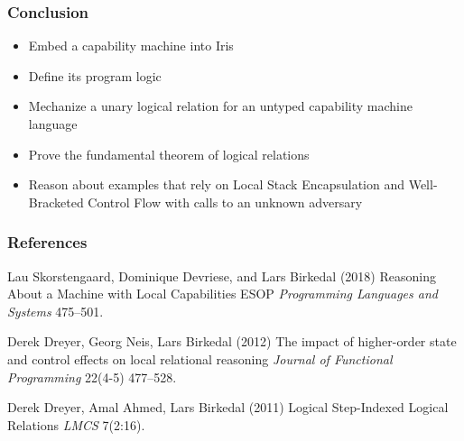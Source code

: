 \documentclass{beamer}
\begin{document}

\begin{frame}
\frametitle{Conclusion}

\begin{itemize}
	\item Embed a capability machine into Iris
	\item Define its program logic 
	\item Mechanize a unary logical relation for an untyped capability machine language
	\item Prove the fundamental theorem of logical relations
	\item Reason about examples that rely on Local Stack Encapsulation and Well-Bracketed Control Flow with calls to an unknown adversary
\end{itemize}

\end{frame}



\begin{frame}
\frametitle{References}
\footnotesize{
\begin{thebibliography}{99} %
 Lau Skorstengaard, 
Dominique Devriese, 
and Lars Birkedal (2018)
\newblock Reasoning About a Machine with Local Capabilities
\newblock ESOP \emph{Programming Languages and Systems} 475--501.

 Derek Dreyer, Georg Neis, Lars Birkedal (2012)
\newblock The impact of higher-order state and control effects on local relational reasoning
\newblock \emph{Journal of Functional Programming} 22(4-5) 477--528.

 Derek Dreyer, Amal Ahmed, Lars Birkedal (2011)
\newblock Logical Step-Indexed Logical Relations
\newblock \emph{LMCS} 7(2:16).

\end{thebibliography}
}
\end{frame}

\end{document}
